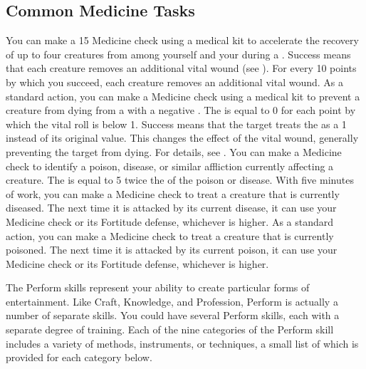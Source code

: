     \subsection{Common Medicine Tasks}
        \label{Accelerate Recovery}
            You can make a  15 Medicine check using a medical kit to accelerate the recovery of up to four creatures from among yourself and your  during a .
            Success means that each creature removes an additional vital wound (see ).
            For every 10 points by which you succeed, each creature removes an additional vital wound.
        \label{First Aid}
            As a standard action, you can make a Medicine check using a medical kit to prevent a creature from dying from a  with a negative .
            The  is equal to 0  for each point by which the vital roll is below 1.
            Success means that the target treats the  as a 1 instead of its original value.
            This changes the effect of the vital wound, generally preventing the target from dying.
            For details, see .
        \label{Identify Affliction}
            You can make a Medicine check to identify a poison, disease, or similar affliction currently affecting a creature.
            The  is equal to 5 \add twice the  of the poison or disease.
         With five minutes of work, you can make a Medicine check to treat a creature that is currently diseased.
            The next time it is attacked by its current disease, it can use your Medicine check or its Fortitude defense, whichever is higher.
         As a standard action, you can make a Medicine check to treat a creature that is currently poisoned.
            The next time it is attacked by its current poison, it can use your Medicine check or its Fortitude defense, whichever is higher.

\newpage
{}
    The Perform skills represent your ability to create particular forms of entertainment.
        Like Craft, Knowledge, and Profession, Perform is actually a number of separate skills.
        You could have several Perform skills, each with a separate degree of training.
        Each of the nine categories of the Perform skill includes a variety of methods, instruments, or techniques, a small list of which is provided for each category below.


